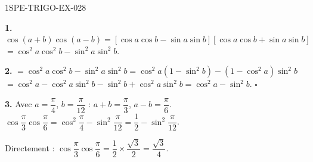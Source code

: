 \begin{corrige}{1SPE-TRIGO-EX-028}

\textbf{1.} $\cos(a+b)\cos(a-b) = [\cos a\cos b - \sin a\sin b][\cos a\cos b + \sin a\sin b]$
$= \cos^2 a\cos^2 b - \sin^2 a\sin^2 b$.

\textbf{2.} $= \cos^2 a\cos^2 b - \sin^2 a\sin^2 b = \cos^2 a(1-\sin^2 b) - (1-\cos^2 a)\sin^2 b$
$= \cos^2 a - \cos^2 a\sin^2 b - \sin^2 b + \cos^2 a\sin^2 b = \cos^2 a - \sin^2 b$. \hfill $\square$

\textbf{3.} Avec $a = \dfrac{\pi}{4}$, $b = \dfrac{\pi}{12}$ : $a+b = \dfrac{\pi}{3}$, $a-b = \dfrac{\pi}{6}$.
$\cos\dfrac{\pi}{3}\cos\dfrac{\pi}{6} = \cos^2\dfrac{\pi}{4} - \sin^2\dfrac{\pi}{12} = \dfrac{1}{2} - \sin^2\dfrac{\pi}{12}$.

Directement : $\cos\dfrac{\pi}{3}\cos\dfrac{\pi}{6} = \dfrac{1}{2} \times \dfrac{\sqrt{3}}{2} = \dfrac{\sqrt{3}}{4}$. \checkmark

\end{corrige}
